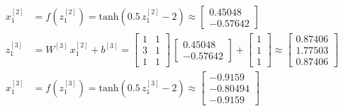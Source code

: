 \documentclass[12pt]{article}
\begin{document}
\begin{enumerate}[leftmargin=\labelsep]
\begin{align*}
          {x}^{[2]}_1 & = f\left({z}^{[2]}_1\right) = \text{tanh}\left(0.5\,{z}^{[2]}_1 - 2\right) \approx \begin{bmatrix} 0.45048 \\ -0.57642\end{bmatrix}                                        \\
          z^{[3]}_1   & = {W}^{[3]} \, {x}^{[2]}_1 + {b}^{[3]} = \begin{bmatrix} 1 & 1 \\ 3 & 1 \\ 1 & 1\end{bmatrix} \,  \begin{bmatrix} 0.45048 \\ -0.57642\end{bmatrix} +
          \begin{bmatrix} 1 \\ 1 \\ 1\end{bmatrix} \approx \begin{bmatrix} 0.87406 \\ 1.77503 \\ 0.87406\end{bmatrix}                                                                              \\
          {x}^{[3]}_1 & = f\left({z}^{[3]}_1\right) = \text{tanh}\left(0.5\,{z}^{[3]}_1 - 2\right) \approx \begin{bmatrix} -0.9159 \\ -0.80494 \\ -0.9159\end{bmatrix}
        \end{align*}
        \endgroup


\end{enumerate}
\end{document}
